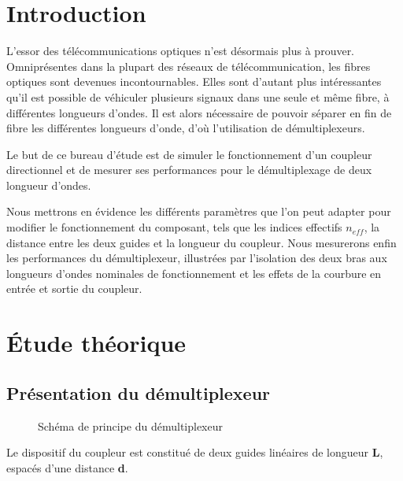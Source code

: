 \documentclass[a4paper,11pt]{report}
\begin{document}


\chapter*{Introduction}

L'essor des télécommunications optiques n'est désormais plus à prouver. Omniprésentes dans la plupart des réseaux de télécommunication, les fibres optiques sont devenues incontournables. Elles sont d'autant plus intéressantes qu'il est possible de véhiculer plusieurs signaux dans une seule et même fibre, à différentes longueurs d'ondes. \newline
Il est alors nécessaire de pouvoir séparer en fin de fibre les différentes longueurs d'onde, d'où l'utilisation de démultiplexeurs.

Le but de ce bureau d'étude est de simuler le fonctionnement d'un coupleur directionnel et de mesurer ses performances pour le démultiplexage de deux longueur d'ondes.

Nous mettrons en évidence les différents paramètres que l'on peut adapter pour modifier le fonctionnement du composant, tels que les indices effectifs $n_{eff}$, la distance entre les deux guides et la longueur du coupleur.
\newline
\indent Nous mesurerons enfin les performances du démultiplexeur, illustrées par l'isolation des deux bras aux longueurs d'ondes nominales de fonctionnement et les effets de la courbure en entrée et sortie du coupleur.


\chapter{Étude théorique}

\section{Présentation du démultiplexeur}
\begin{figure}[H]
    \begin{center}
        
        \caption{Schéma de principe du démultiplexeur}
        \label{fig:}
    \end{center}
\end{figure}

Le dispositif du coupleur est constitué de deux guides linéaires de longueur \textbf{L}, espacés d'une distance \textbf{d}.
\end{document}
